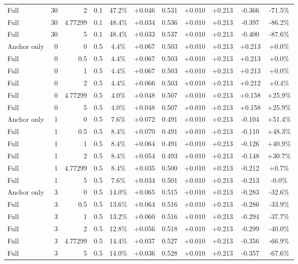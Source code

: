 \begin{table}[htbp]
\begin{tabular}{lrrrccccccc}
Full & 30 & 2 & 0.1 & 47.2\% & +0.046 & 0.531 & +0.010 & +0.213 & -0.366 & -71.5\% \\
Full & 30 & 4.77299 & 0.1 & 48.4\% & +0.034 & 0.536 & +0.010 & +0.213 & -0.397 & -86.2\% \\
Full & 30 & 5 & 0.1 & 48.4\% & +0.033 & 0.537 & +0.010 & +0.213 & -0.400 & -87.6\% \\
Anchor only & 0 & 0 & 0.5 & 4.4\% & +0.067 & 0.503 & +0.010 & +0.213 & +0.213 & +0.0\% \\
Full & 0 & 0.5 & 0.5 & 4.4\% & +0.067 & 0.503 & +0.010 & +0.213 & +0.213 & +0.0\% \\
Full & 0 & 1 & 0.5 & 4.4\% & +0.067 & 0.503 & +0.010 & +0.213 & +0.213 & +0.0\% \\
Full & 0 & 2 & 0.5 & 4.4\% & +0.066 & 0.503 & +0.010 & +0.213 & +0.212 & +0.4\% \\
Full & 0 & 4.77299 & 0.5 & 4.0\% & +0.048 & 0.507 & +0.010 & +0.213 & +0.158 & +25.9\% \\
Full & 0 & 5 & 0.5 & 4.0\% & +0.048 & 0.507 & +0.010 & +0.213 & +0.158 & +25.9\% \\
Anchor only & 1 & 0 & 0.5 & 7.6\% & +0.072 & 0.491 & +0.010 & +0.213 & -0.104 & +51.4\% \\
Full & 1 & 0.5 & 0.5 & 8.4\% & +0.070 & 0.491 & +0.010 & +0.213 & -0.110 & +48.3\% \\
Full & 1 & 1 & 0.5 & 8.4\% & +0.064 & 0.491 & +0.010 & +0.213 & -0.126 & +40.9\% \\
Full & 1 & 2 & 0.5 & 8.4\% & +0.054 & 0.493 & +0.010 & +0.213 & -0.148 & +30.7\% \\
Full & 1 & 4.77299 & 0.5 & 8.4\% & +0.035 & 0.500 & +0.010 & +0.213 & -0.212 & +0.7\% \\
Full & 1 & 5 & 0.5 & 7.6\% & +0.034 & 0.501 & +0.010 & +0.213 & -0.213 & -0.0\% \\
Anchor only & 3 & 0 & 0.5 & 14.0\% & +0.065 & 0.515 & +0.010 & +0.213 & -0.283 & -32.6\% \\
Full & 3 & 0.5 & 0.5 & 13.6\% & +0.064 & 0.516 & +0.010 & +0.213 & -0.286 & -33.9\% \\
Full & 3 & 1 & 0.5 & 13.2\% & +0.060 & 0.516 & +0.010 & +0.213 & -0.294 & -37.7\% \\
Full & 3 & 2 & 0.5 & 12.8\% & +0.056 & 0.518 & +0.010 & +0.213 & -0.299 & -40.0\% \\
Full & 3 & 4.77299 & 0.5 & 14.4\% & +0.037 & 0.527 & +0.010 & +0.213 & -0.356 & -66.9\% \\
Full & 3 & 5 & 0.5 & 14.0\% & +0.036 & 0.528 & +0.010 & +0.213 & -0.357 & -67.6\% \\

\end{tabular}
\end{table}
